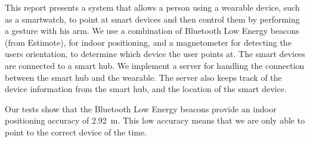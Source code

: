 This report presents a system that allows a person using a wearable device, such as a smartwatch, to point at smart devices and then control them by performing a gesture with his arm. We use a combination of Bluetooth Low Energy beacons (from Estimote), for indoor positioning, and a magnetometer for detecting the users orientation, to determine which device the user points at. The smart devices are connected to a smart hub. We implement a server for handling the connection between the smart hub and the wearable. The server also keeps track of the device information from the smart hub, and the location of the smart device.

Our tests show that the Bluetooth Low Energy beacons provide an indoor positioning accuracy of \SI{2.92}{\meter}. This low accuracy means that we are only able to point to the correct device  of the time. 